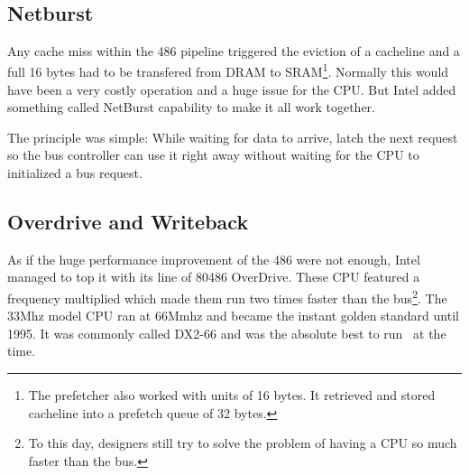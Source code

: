 \par
{}\\
\par




\subsection{Netburst}
Any cache miss within the 486 pipeline triggered the eviction of a cacheline and a full 16 bytes had to be transfered from DRAM to SRAM\footnote{The prefetcher also worked with units of 16 bytes. It retrieved and stored cacheline into a prefetch queue of 32 bytes.}. Normally this would have been a very costly operation and a huge issue for the CPU. But Intel added something called NetBurst capability to make it all work together.\\
\par
The principle was simple: While waiting for data to arrive, latch the next request so the bus controller can use it right away without waiting for the CPU to initialized a bus request.\\
\par
{}







\subsection{Overdrive and Writeback}
As if the huge performance improvement of the 486 were not enough, Intel managed to top it with its line of 80486 OverDrive. These CPU featured a frequency multiplied which made them run two times faster than the bus\footnote{To this day, designers still try to solve the problem of having a CPU so much faster than the bus.}. The 33Mhz model CPU ran at 66Mmhz and became the instant golden standard until 1995. It was commonly called DX2-66 and was the absolute best to run \doom~at the time.\\
\par 
{}%
\par

